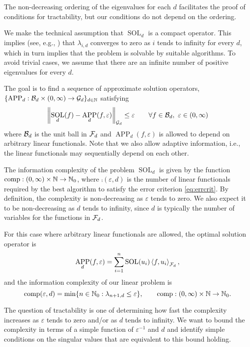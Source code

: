 \documentclass[11pt,a4paper]{article}
\DeclareMathOperator{\SOL}{SOL}
\DeclareMathOperator{\APP}{APP}
\begin{document}
The non-decreasing ordering of the eigenvalues for each $d$ facilitates the proof of conditions for tractability, but our conditions do not depend on the ordering.

We make the technical assumption that $\SOL_d$ is a compact operator. This implies (see, e.g., \cite{NW08}) that $\lambda_{i,d}$ converges to zero as $i$ tends to infinity for every $d$, which in turn implies that the problem is solvable by suitable algorithms. To avoid trivial cases, we assume that there are an infinite number of positive eigenvalues for every $d$.

The goal is to find a sequence of approximate solution operators, $\{\APP_d:\cb_d \times (0,\infty) \to \cg_d\}_{d \in \naturals}$ satisfying
\begin{equation}
    \label{eq:errcrit}
    \norm[\cg_d]{\SOL_d(f) - \APP_d(f,\varepsilon)} \le \varepsilon \qquad \forall f \in \cb_d, \ \varepsilon \in (0,\infty)
\end{equation}
where $\mathcal{B}_d$ is the unit ball in $\mathcal{F}_d$ and $\APP_d(f,\varepsilon)$ is allowed to depend on arbitrary linear functionals.  Note that we also allow adaptive information, i.e., the linear functionals may sequentially depend on each other.

The information complexity of the problem $\SOL_d$ is given by the function $\operatorname{comp}:(0,\infty) \times \mathbb{N} \to \mathbb{N}_{0}$, where $\comp(\varepsilon,d)$ is the number of linear functionals required by the best algorithm to satisfy the error criterion \eqref{eq:errcrit}.
By definition, the complexity is non-decreasing  as $\varepsilon$ tends to zero.  We also expect it to be non-decreasing as $d$ tends to infinity, since $d$ is typically the number of variables for the functions in $\mathcal{F}_d$.

For this case where arbitrary linear functionals are allowed, the optimal solution operator is
\[
\APP_d(f,\varepsilon) = \sum_{i=1}^n \SOL(u_i) \ip[\cf_d]{f}{u_i},
\]
and the information complexity of our linear problem is
\begin{equation}\label{eq:comp_def}
\operatorname{comp}(\varepsilon, d) = \min \{n \in \mathbb{N}_{0} : \lambda_{n+1, d} \le \varepsilon\}, \qquad \operatorname{comp}:(0,\infty) \times \mathbb{N} \to \mathbb{N}_{0}.
\end{equation}


The question of tractability is one of determining how fast the complexity increases as $\varepsilon$ tends to zero and/or as $d$ tends to infinity.  We want to bound the complexity in terms of a simple function of $\varepsilon^{-1}$ and $d$ and identify simple conditions on the singular values that are equivalent to this bound holding.
\end{document}
